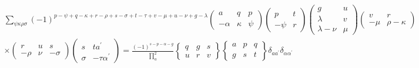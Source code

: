 \begin{gather*}
\sum_{\psi \kappa \rho \sigma}(-1)^{p-\psi+q-\kappa+r-\rho+s-\sigma+t-\tau+v-\mu+u-\nu+g-\lambda}\left(\begin{array}{rcc}
a & q & p \\
-\alpha & \kappa & \psi
\end{array}\right)\left(\begin{array}{rr}
p & t \\
-\psi & r
\end{array}\right)\left(\begin{array}{rr}
g & u \\
\lambda & v \\
\lambda-\nu & \mu
\end{array}\right)\left(\begin{array}{rr}
v & r \\
-\mu & \rho-\kappa
\end{array}\right) \\
\times\left(\begin{array}{rrr}
r & u & s \\
-\rho & \nu & -\sigma
\end{array}\right)\left(\begin{array}{rr}
s & t a^{\prime} \\
\sigma & -\tau \alpha^{\prime}
\end{array}\right)=\frac{(-1)^{s-p-\alpha-g}}{\prod_{a}^{2}}\left\{\begin{array}{lll}
q & g & s \\
u & r & v
\end{array}\right\}\left\{\begin{array}{lll}
a & p & q \\
g & s & t
\end{array}\right\} \delta_{a a^{\prime}} \delta_{\alpha \alpha^{\prime}} \tag{20}
\end{gather*}


